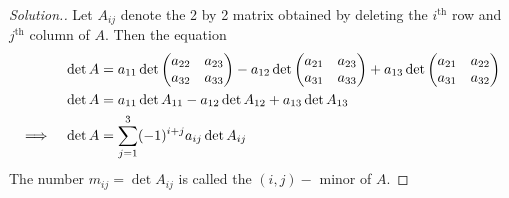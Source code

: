 \documentclass[11pt,a4paper]{article}
\theoremstyle{definition}
\newenvironment{solution}
  {\renewcommand{\qedsymbol}{}\begin{proof}[\textit{Solution}.]}
  {\end{proof}}
\begin{document}
\begin{solution}
Let $A_{ij}$ denote the 2 by 2 matrix obtained by deleting the $i^{\text{th}}$ row and $j^{\text{th}}$ column of $A$. Then the equation
\begin{align*}
\det A &=a_{11}\det
\begin{pmatrix}
a_{22}&a_{23}\\a_{32}&a_{33}
\end{pmatrix}
-a_{12}\det
\begin{pmatrix}
a_{21}&a_{23}\\a_{31}&a_{33}\\
\end{pmatrix}
+a_{13}\det
\begin{pmatrix}
a_{21}&a_{22}\\a_{31}&a_{32}\\
\end{pmatrix}\\
\det A &=a_{11}\det A_{11}-a_{12}\det A_{12}+a_{13}\det A_{13}\\
\implies\hspace{0.3cm} \det A &=\sum^3_{j=1}(-1)^{i+j}a_{ij}\det A_{ij}
\end{align*}
The number $m_{ij}=\det A_{ij}$ is called the $(i,j)-$ minor of $A$.
\end{solution}
\end{document}
